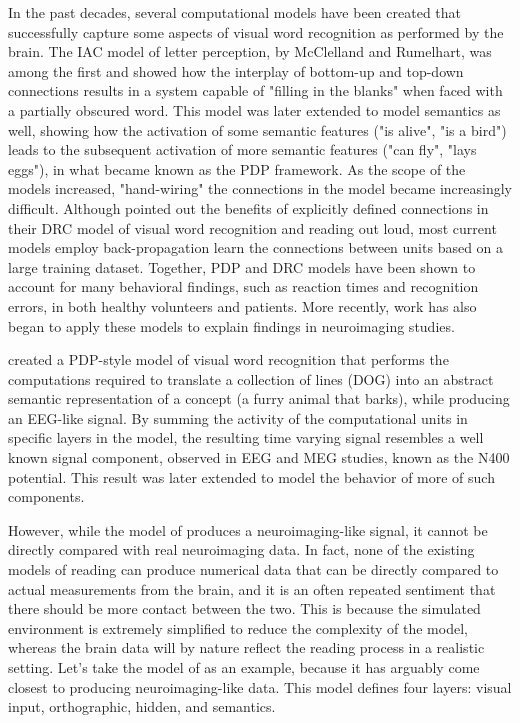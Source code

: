 \documentclass[a4paper, 10pt]{vanvliet_paper}
\newcommand{\word}[1]{\textsf{\scriptsize{}#1}}
\begin{document}
In the past decades, several computational models have been created that successfully capture some aspects of visual word recognition as performed by the brain.
The \gls{IAC} model of letter perception, by McClelland and Rumelhart\cite{McClelland1981, Rumelhart1982}, was among the first and showed how the interplay of bottom-up and top-down connections results in a system capable of "filling in the blanks" when faced with a partially obscured word.
This model was later extended to model semantics as well, showing how the activation of some semantic features ("is alive", "is a bird") leads to the subsequent activation of more semantic features ("can fly", "lays eggs"), in what became known as the \gls{PDP} framework\cite{McClelland2003}.
As the scope of the models increased, "hand-wiring" the connections in the model became increasingly difficult.
Although \textcite{Coltheart2001} pointed out the benefits of explicitly defined connections in their \gls{DRC} model of visual word recognition and reading out loud, most current models employ back-propagation learn the connections between units based on a large training dataset.
Together, \gls{PDP} and \gls{DRC} models have been shown to account for many behavioral findings, such as reaction times and recognition errors, in both healthy volunteers and patients\cite{McLeod2000, McClelland2003, Perry2007}.
More recently, work has also began to apply these models to explain findings in neuroimaging studies.

\textcite{Laszlo2012} created a \gls{PDP}-style model of visual word recognition that performs the computations required to translate a collection of lines (\word{DOG}) into an abstract semantic representation of a concept (a furry animal that barks), while producing an \gls{EEG}-like signal.
By summing the activity of the computational units in specific layers in the model, the resulting time varying signal resembles a well known signal component, observed in \gls{EEG} and \gls{MEG} studies, known as the N400 potential\cite{Kutas2011}.
This result was later extended to model the behavior of more of such components\cite{Laszlo2014}.

However, while the model of \textcite{Laszlo2014} produces a neuroimaging-like signal, it cannot be directly compared with real neuroimaging data.
In fact, none of the existing models of reading can produce numerical data that can be directly compared to actual measurements from the brain, and it is an often repeated sentiment that there should be more contact between the two\cite{Carreiras2014, Laszlo2012, Laszlo2014, Poeppel2012, Taylor2013}.
This is because the simulated environment is extremely simplified to reduce the complexity of the model, whereas the brain data will by nature reflect the reading process in a realistic setting.
Let's take the model of \textcite{Laszlo2014} as an example, because it has arguably come closest to producing neuroimaging-like data.
This model defines four layers: visual input, orthographic, hidden, and semantics.
\end{document}
